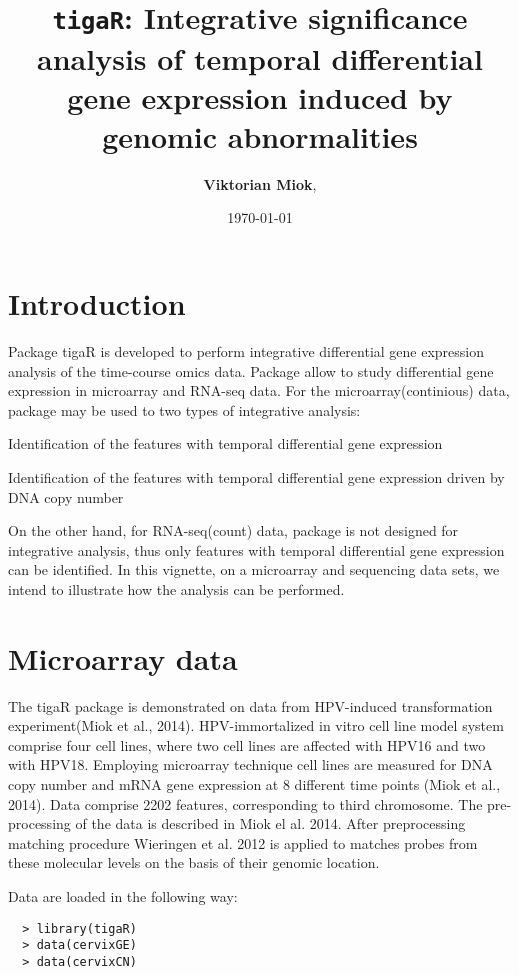 \documentclass[a4paper]{article}
\date{}
\title{{\tt tigaR}: Integrative significance analysis of temporal differential gene expression induced by genomic abnormalities}
\date{\today}
\author{\textbf{Viktorian Miok},}
\begin{document}
\maketitle

\section{Introduction}

Package tigaR is developed to perform integrative differential gene expression analysis of the time-course omics data. Package allow to study differential gene expression in microarray and RNA-seq data. For the microarray(continious) data, package may be used to two types of integrative analysis:
\begin{compactitem}
\item Identification of the features with temporal differential gene expression 
\item Identification of the features with temporal differential gene expression driven by DNA copy number
\end{compactitem}
On the other hand, for RNA-seq(count) data, package is not designed for integrative analysis, thus only features with temporal differential gene expression can be identified. In this vignette, on a microarray and sequencing data sets, we intend to illustrate how the analysis can be performed.

\section{Microarray data}

The tigaR package is demonstrated on data from HPV-induced transformation experiment(Miok et al., 2014). HPV-immortalized in vitro cell line model system comprise four cell lines, where two cell lines are affected with HPV16 and two with HPV18. Employing microarray technique cell lines are measured for DNA copy number and mRNA gene expression at 8 different time points (Miok et al., 2014). Data comprise 2202 features, corresponding to third chromosome. The pre-processing of the data is described in Miok el al. 2014. After preprocessing matching procedure Wieringen et al. 2012 is applied to matches probes from these molecular levels on the basis of their genomic location.

Data are loaded in the following way:
\begin{verbatim}
  > library(tigaR)
  > data(cervixGE)
  > data(cervixCN)
\end{verbatim}
\end{document}
